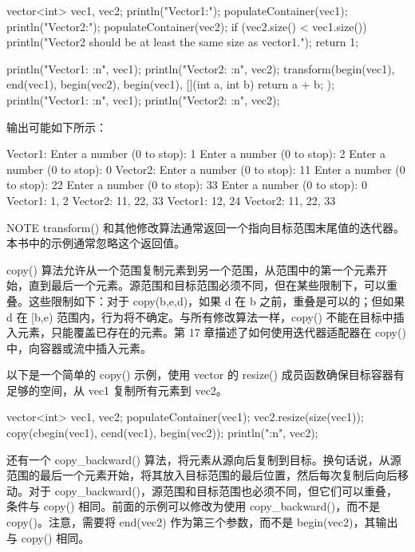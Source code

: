 \begin{cpp}
vector<int> vec1, vec2;
println("Vector1:"); populateContainer(vec1);
println("Vector2:"); populateContainer(vec2);
if (vec2.size() < vec1.size())
{
    println("Vector2 should be at least the same size as vector1.");
    return 1;
}

println("Vector1: {:n}", vec1);
println("Vector2: {:n}", vec2);
transform(begin(vec1), end(vec1), begin(vec2), begin(vec1),
    [](int a, int b){ return a + b; });
println("Vector1: {:n}", vec1);
println("Vector2: {:n}", vec2);
\end{cpp}

输出可能如下所示：

\begin{shell}
Vector1:
Enter a number (0 to stop): 1
Enter a number (0 to stop): 2
Enter a number (0 to stop): 0
Vector2:
Enter a number (0 to stop): 11
Enter a number (0 to stop): 22
Enter a number (0 to stop): 33
Enter a number (0 to stop): 0
Vector1: 1, 2
Vector2: 11, 22, 33
Vector1: 12, 24
Vector2: 11, 22, 33
\end{shell}

\begin{myNotic}{NOTE}
transform() 和其他修改算法通常返回一个指向目标范围末尾值的迭代器。本书中的示例通常忽略这个返回值。
\end{myNotic}


copy() 算法允许从一个范围复制元素到另一个范围，从范围中的第一个元素开始，直到最后一个元素。源范围和目标范围必须不同，但在某些限制下，可以重叠。这些限制如下：对于 copy(b,e,d)，如果 d 在 b 之前，重叠是可以的；但如果 d 在 [b,e) 范围内，行为将不确定。与所有修改算法一样，copy() 不能在目标中插入元素，只能覆盖已存在的元素。第 17 章描述了如何使用迭代器适配器在 copy() 中，向容器或流中插入元素。

以下是一个简单的 copy() 示例，使用 vector 的 resize() 成员函数确保目标容器有足够的空间，从 vec1 复制所有元素到 vec2。

\begin{cpp}
vector<int> vec1, vec2;
populateContainer(vec1);
vec2.resize(size(vec1));
copy(cbegin(vec1), cend(vec1), begin(vec2));
println("{:n}", vec2);
\end{cpp}

还有一个 copy\_backward() 算法，将元素从源向后复制到目标。换句话说，从源范围的最后一个元素开始，将其放入目标范围的最后位置，然后每次复制后向后移动。对于 copy\_backward()，源范围和目标范围也必须不同，但它们可以重叠，条件与 copy() 相同。前面的示例可以修改为使用 copy\_backward()，而不是 copy()。注意，需要将 end(vec2) 作为第三个参数，而不是 begin(vec2)，其输出与 copy() 相同。

